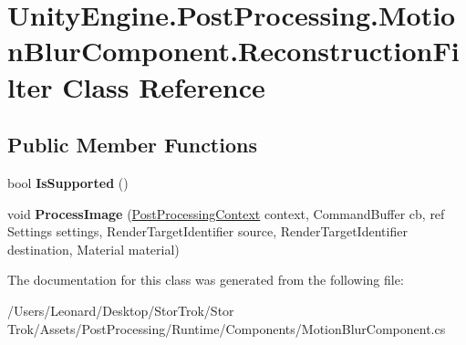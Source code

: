 \hypertarget{class_unity_engine_1_1_post_processing_1_1_motion_blur_component_1_1_reconstruction_filter}{}\section{Unity\+Engine.\+Post\+Processing.\+Motion\+Blur\+Component.\+Reconstruction\+Filter Class Reference}
\label{class_unity_engine_1_1_post_processing_1_1_motion_blur_component_1_1_reconstruction_filter}
\subsection*{Public Member Functions}
\begin{DoxyCompactItemize}
\item 
\mbox{\label{class_unity_engine_1_1_post_processing_1_1_motion_blur_component_1_1_reconstruction_filter_a1ae5385e2ce35105c89b09d668d08cb5}} 
bool {\bfseries Is\+Supported} ()
\item 
\mbox{\label{class_unity_engine_1_1_post_processing_1_1_motion_blur_component_1_1_reconstruction_filter_a10805735f3c20028314f16e0bc6e06b5}} 
void {\bfseries Process\+Image} (\hyperlink{class_unity_engine_1_1_post_processing_1_1_post_processing_context}{Post\+Processing\+Context} context, Command\+Buffer cb, ref Settings settings, Render\+Target\+Identifier source, Render\+Target\+Identifier destination, Material material)
\end{DoxyCompactItemize}


The documentation for this class was generated from the following file\+:\begin{DoxyCompactItemize}
\item 
/\+Users/\+Leonard/\+Desktop/\+Stor\+Trok/\+Stor Trok/\+Assets/\+Post\+Processing/\+Runtime/\+Components/Motion\+Blur\+Component.\+cs\end{DoxyCompactItemize}
